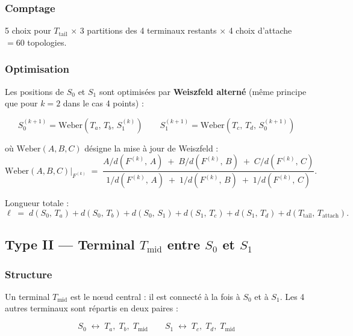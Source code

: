 \documentclass[12pt, a4paper]{article}
\newcommand{\dist}[2]{d\!\left(#1,\,#2\right)}
\begin{document}
\subsubsection{Comptage}

5 choix pour $T_\text{tail}$ $\times$ 3 partitions des 4 terminaux restants $\times$
4 choix d'attache $= 60$ topologies.

\subsubsection{Optimisation}

Les positions de $S_0$ et $S_1$ sont optimisées par \textbf{Weiszfeld alterné}
(même principe que pour $k = 2$ dans le cas 4 points) :

\[
    S_0^{(k+1)} = \text{Weber}\!\left(T_a,\, T_b,\, S_1^{(k)}\right)
    \qquad
    S_1^{(k+1)} = \text{Weber}\!\left(T_c,\, T_d,\, S_0^{(k+1)}\right)
\]

où $\text{Weber}(A, B, C)$ désigne la mise à jour de Weiszfeld :
\[
    \text{Weber}(A, B, C) \Big|_{F^{(k)}}
    \;=\;
    \frac{A/\dist{F^{(k)}}{A} \;+\; B/\dist{F^{(k)}}{B} \;+\; C/\dist{F^{(k)}}{C}}
         {1/\dist{F^{(k)}}{A} \;+\; 1/\dist{F^{(k)}}{B} \;+\; 1/\dist{F^{(k)}}{C}}.
\]

Longueur totale :
\[
    \ell \;=\;
    \dist{S_0}{T_a} + \dist{S_0}{T_b} + \dist{S_0}{S_1}
    + \dist{S_1}{T_c} + \dist{S_1}{T_d}
    + \dist{T_\text{tail}}{T_\text{attach}}.
\]

\subsection{Type II — Terminal $T_\text{mid}$ entre $S_0$ et $S_1$}

\subsubsection{Structure}

Un terminal $T_\text{mid}$ est le nœud central : il est connecté à la fois à
$S_0$ et à $S_1$. Les 4 autres terminaux sont répartis en deux paires :

\[
    S_0 \;\leftrightarrow\; T_a,\; T_b,\; T_\text{mid}
    \qquad
    S_1 \;\leftrightarrow\; T_c,\; T_d,\; T_\text{mid}
\]
\end{document}
